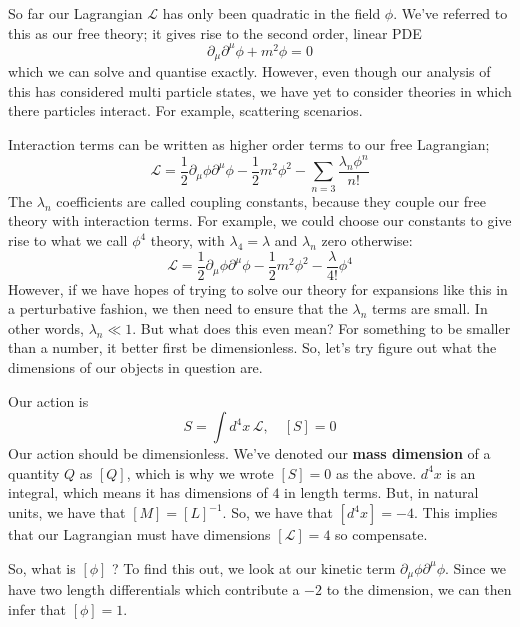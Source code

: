 \documentclass[11pt, oneside]{article}   	%
\theoremstyle{newline}
\theoremstyle{newline}
\theoremstyle{newline}
\theoremstyle{newline}
\theoremstyle{newline}
\begin{document}
\par 
So far our Lagrangian $ \mathcal{ L }$ has only been quadratic in the field
$ \phi $. We've referred to this as our free theory; it gives rise to 
the second order, linear PDE 
\[
\partial _\mu \partial ^\mu \phi + m^2 \phi = 0 
\] which we can solve and quantise exactly. 
However, even though our analysis of this has considered multi particle states, 
we have yet to consider theories in which there particles interact. 
For example, scattering scenarios. 

Interaction terms can be written as higher order terms to our 
free Lagrangian; 
\[
\mathcal{ L } = \frac{1}{2 } \partial _\mu \phi \partial ^\mu \phi  - \frac{1}{2 }m^ 2 \phi ^ 2 - \sum_{n=3 } \frac{ \lambda _n \phi ^ n }{ n !}
\] The $ \lambda _{ n }  $ coefficients are called coupling constants, 
because they couple our free theory with interaction terms. 
For example, we could choose our constants to give rise to what we call 
$ \phi ^ 4 $  theory, with $ \lambda_ 4 = \lambda  $ and  $ \lambda _ n $ zero otherwise: 
\[
\mathcal{ L } = \frac{1}{2 } \partial _\mu \phi \partial  ^ \mu \phi - \frac{1}{2 } m ^ 2 \phi ^ 2 - \frac{ \lambda }{ 4 ! } \phi ^ 4 
\] However, if we have hopes of trying to solve our 
theory for expansions like this in a perturbative fashion, 
we then need to ensure that the $ \lambda_ n $ terms are small. 
In other words, $ \lambda _ n  \ll 1 $. But what does this even mean? 
For something to be smaller than a number, it better first be dimensionless. 
So, let's try figure out what the dimensions of our objects in question are. 

Our action is 
\[
S = \int d^ 4 x \, \mathcal{ L }, \quad [ S]  =0 
\] Our action should be dimensionless. We've denoted our 
\textbf{mass dimension} of a quantity $ Q $ as $ [ Q] $,
which is why we wrote $ [ S] = 0 $ as the above. 
$ d^4 x $ is an integral, which means it has dimensions of $ 4 $
in length terms. But, in natural units, we have that 
$ [ M ] = [ L ] ^ { - 1} $. 
So, we have that  $ [ d^ 4 x ] = - 4$. 
This implies that our Lagrangian must have dimensions  $ [ \mathcal{ L } ] = 4$
so compensate. 

So, what is $ [ \phi ] $ ? To find this out, 
we look at our kinetic term $ \partial _\mu \phi \partial  ^\mu \phi$. 
Since we have two length differentials which contribute a $ - 2$ to the dimension, we 
can then infer that $ [ \phi ] = 1 $. 
\end{document}

